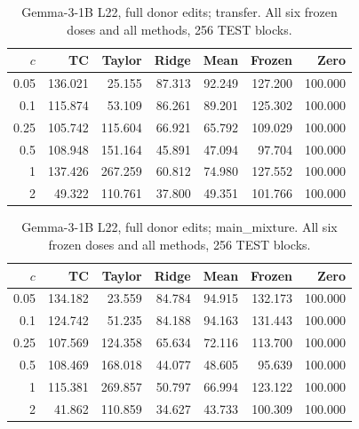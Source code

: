 \begin{table}[!ht]\centering\small
\begin{tabular}{rrrrrrr}\toprule
$c$ & TC & Taylor & Ridge & Mean & Frozen & Zero\\\midrule
0.05 & 136.021 & 25.155 & 87.313 & 92.249 & 127.200 & 100.000\\
0.1 & 115.874 & 53.109 & 86.261 & 89.201 & 125.302 & 100.000\\
0.25 & 105.742 & 115.604 & 66.921 & 65.792 & 109.029 & 100.000\\
0.5 & 108.948 & 151.164 & 45.891 & 47.094 & 97.704 & 100.000\\
1 & 137.426 & 267.259 & 60.812 & 74.980 & 127.552 & 100.000\\
2 & 49.322 & 110.761 & 37.800 & 49.351 & 101.766 & 100.000\\
\bottomrule\end{tabular}
\caption{Gemma-3-1B L22, full donor edits; transfer. All six frozen doses and all methods, 256 TEST blocks.}\end{table}
\begin{table}[!ht]\centering\small
\begin{tabular}{rrrrrrr}\toprule
$c$ & TC & Taylor & Ridge & Mean & Frozen & Zero\\\midrule
0.05 & 134.182 & 23.559 & 84.784 & 94.915 & 132.173 & 100.000\\
0.1 & 124.742 & 51.235 & 84.188 & 94.163 & 131.443 & 100.000\\
0.25 & 107.569 & 124.358 & 65.634 & 72.116 & 113.700 & 100.000\\
0.5 & 108.469 & 168.018 & 44.077 & 48.605 & 95.639 & 100.000\\
1 & 115.381 & 269.857 & 50.797 & 66.994 & 123.122 & 100.000\\
2 & 41.862 & 110.859 & 34.627 & 43.733 & 100.309 & 100.000\\
\bottomrule\end{tabular}
\caption{Gemma-3-1B L22, full donor edits; main\_mixture. All six frozen doses and all methods, 256 TEST blocks.}\end{table}
